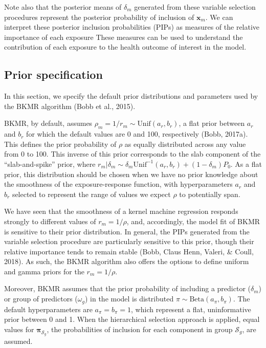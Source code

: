 \documentclass[12pt, twoside]{amherstthesis}
\begin{document}
Note also that the posterior means of \(\delta_m\) generated from these variable selection procedures represent the posterior probability of inclusion of \(\textbf{x}_m\). We can interpret these posterior inclusion probabilities (PIPs) as measures of the relative importance of each exposure These measures can be used to understand the contribution of each exposure to the health outcome of interest in the model.

\hypertarget{bkmrprior}{%
\subsection{Prior specification}\label{bkmrprior}}

In this section, we specify the default prior distributions and parameters used by the BKMR algorithm (Bobb et al., 2015).

BKMR, by default, assumes \(\rho_m=1/r_m \sim \text{Unif}(a_r,b_r)\), a flat prior between \(a_r\) and \(b_r\) for which the default values are 0 and 100, respectively (Bobb, 2017a). This defines the prior probability of \(\rho\) as equally distributed across any value from 0 to 100. This inverse of this prior corresponds to the slab component of the ``slab-and-spike'' prior, where \(r_m|\delta_m \sim \delta_m\text{Unif}^{-1}(a_r, b_r) + (1-\delta_m)P_0\). As a flat prior, this distribution should be chosen when we have no prior knowledge about the smoothness of the exposure-response function, with hyperparameters \(a_r\) and \(b_r\) selected to represent the range of values we expect \(\rho\) to potentially span.

We have seen that the smoothness of a kernel machine regression responds strongly to different values of \(r_m=1/\rho\), and, accordingly, the model fit of BKMR is sensitive to their prior distribution. In general, the PIPs generated from the variable selection procedure are particularly sensitive to this prior, though their relative importance tends to remain stable (Bobb, Claus Henn, Valeri, \& Coull, 2018). As such, the BKMR algorithm also offers the options to define uniform and gamma priors for the \(r_m=1/\rho\).

Moreover, BKMR assumes that the prior probability of including a predictor (\(\delta_m\)) or group of predictors (\(\omega_g\)) in the model is distributed \(\pi \sim \text{Beta}(a_\pi, b_\pi)\). The default hyperparameters are \(a_\pi=b_\pi=1\), which represent a flat, uninformative prior between 0 and 1. When the hierarchical selection approach is applied, equal values for \(\boldsymbol\pi_{\mathcal{S}_g}\), the probabilities of inclusion for each component in group \(\mathcal{S}_g\), are assumed.
\end{document}
